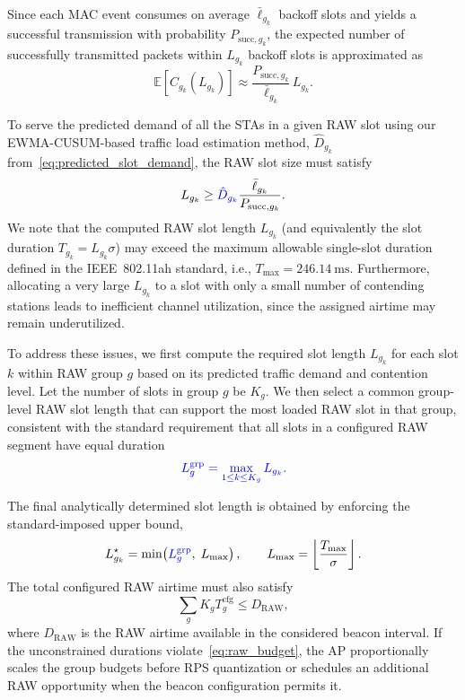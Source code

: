 \documentclass[journal]{IEEEtran}
\newcommand{\rev}[1]{{\color{blue}#1}}
\begin{document}
Since each MAC event consumes on average $\bar{\ell}_{g_k}$ backoff slots and yields a successful transmission with probability $P_{\text{succ},g_k}$, the expected number of successfully transmitted packets within $L_{g_k}$ backoff slots is approximated as
\begin{equation}
\mathbb{E}[C_{g_k}(L_{g_k})]
\approx
\frac{P_{\text{succ},g_k}}{\bar{\ell}_{g_k}}\,L_{g_k}.
\end{equation}

To serve the predicted demand of all the STAs in a given RAW slot using our EWMA-CUSUM-based traffic load estimation method, \rev{$\hat{D}_{g_k}$ from~\eqref{eq:predicted_slot_demand}}, the RAW slot size must satisfy
\begin{equation}
L_{g_k}
\ge
\rev{\hat{D}_{g_k}}\frac{\bar{\ell}_{g_k}}{P_{\text{succ},g_k}}.
\end{equation}
We note that the computed RAW slot length $L_{g_k}$ (and equivalently the slot duration $T_{g_k}=L_{g_k}\sigma$) may exceed the maximum allowable single-slot duration defined in the IEEE~802.11ah standard, i.e., $T_{\max}=246.14~\mathrm{ms}$. Furthermore, allocating a very large $L_{g_k}$ to a slot with only a small number of contending stations leads to inefficient channel utilization, since the assigned airtime may remain underutilized.

To address these issues, we first compute the required slot length $L_{g_k}$ for each slot $k$ within RAW group $g$ based on its predicted traffic demand and contention level. Let the number of slots in group $g$ be $K_g$. We then \rev{select a common group-level RAW slot length that can support the most loaded RAW slot in that group, consistent with the standard requirement that all slots in a configured RAW segment have equal duration}
\begin{equation}
\rev{L_g^{\mathrm{grp}} = \max_{1\le k\le K_g} L_{g_k}.}
\end{equation}

The final analytically determined slot length is obtained by enforcing the standard-imposed upper bound,
\begin{equation}
L^{\star}_{g_k}
=
\min\!\left(
\rev{L_g^{\mathrm{grp}}},\;
L_{\max}
\right),
\qquad
L_{\max}=\left\lfloor \frac{T_{\max}}{\sigma} \right\rfloor.
\end{equation}
\begingroup\color{blue}
The total configured RAW airtime must also satisfy
\begin{equation}
\sum_g K_g T_g^{\mathrm{cfg}} \le D_{\mathrm{RAW}},
\label{eq:raw_budget}
\end{equation}
where $D_{\mathrm{RAW}}$ is the RAW airtime available in the considered beacon interval. If the unconstrained durations violate~\eqref{eq:raw_budget}, the AP proportionally scales the group budgets before RPS quantization or schedules an additional RAW opportunity when the beacon configuration permits it.
\endgroup
\end{document}
